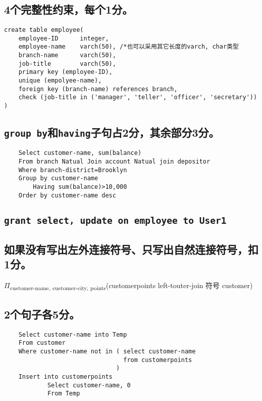 \documentclass{ctexart}
\begin{document}
\section{}
\subsection{4个完整性约束，每个1分。}
\begin{verbatim}
create table employee(
    employee-ID	     integer,
    employee-name    varch(50), /*也可以采用其它长度的varch, char类型
    branch-name	     varch(50),
    job-title        varch(50),
    primary key (employee-ID),
    unique (empolyee-name),
    foreign key (branch-name) references branch,
    check (job-title in ('manager', 'teller', 'officer', 'secretary'))
)
\end{verbatim}
\subsection{\texttt{group by}和\texttt{having}子句占2分，其余部分3分。}
\begin{verbatim}
    Select customer-name, sum(balance)
    From branch Natual Join account Natual join depositor
    Where branch-district=Brooklyn
    Group by customer-name
        Having sum(balance)>10,000
    Order by customer-name desc
\end{verbatim}
\subsection{\texttt{grant select, update on employee to User1}}
\subsection{如果没有写出左外连接符号、只写出自然连接符号，扣1分。}
$\Pi$\textsubscript{customer-name, customer-city, points}(customerpoints left-touter-join 符号 customer)
\subsection{2个句子各5分。}
\begin{verbatim}
    Select customer-name into Temp
    From customer
    Where customer-name not in ( select customer-name
                                 from customerpoints
                               )
    Insert into customerpoints
            Select customer-name, 0
            From Temp
\end{verbatim}
\section{}
\end{document}
